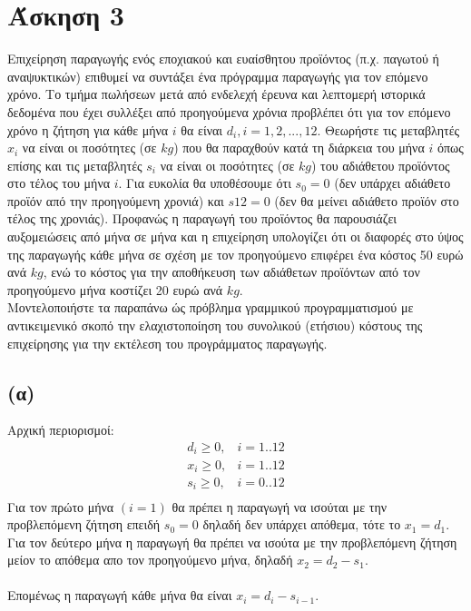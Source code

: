\documentclass[12pt]{report}
\begin{document}
\section*{Άσκηση 3}
Επιχείρηση παραγωγής ενός εποχιακού και ευαίσθητου προϊόντος (π.χ. παγωτού ή
αναψυκτικών) επιθυμεί να συντάξει ένα πρόγραμμα παραγωγής για τον επόμενο
χρόνο. Το τμήμα πωλήσεων μετά από ενδελεχή έρευνα και λεπτομερή ιστορικά
δεδομένα
που έχει συλλέξει από προηγούμενα χρόνια προβλέπει ότι για τον επόμενο χρόνο η
ζήτηση
για κάθε μήνα $i$ θα είναι $d_i, i = 1, 2, . . . , 12$. Θεωρήστε τις μεταβλητές
$x_i$ να είναι οι ποσότητες (σε $kg$) που θα παραχθούν κατά τη διάρκεια του
μήνα $i$ όπως επίσης και τις μεταβλητές
$s_i$ να είναι οι ποσότητες (σε $kg$) του αδιάθετου προϊόντος στο τέλος του
μήνα $i$. Για ευκολία
θα υποθέσουμε ότι $s_0 = 0$ (δεν υπάρχει αδιάθετο προϊόν από την προηγούμενη
χρονιά) και
$s{12} = 0$ (δεν θα μείνει αδιάθετο προϊόν στο τέλος της χρονιάς). Προφανώς η
παραγωγή του
προϊόντος θα παρουσιάζει αυξομειώσεις από μήνα σε μήνα και η επιχείρηση
υπολογίζει ότι
οι διαφορές στο ύψος της παραγωγής κάθε μήνα σε σχέση με τον προηγούμενο
επιφέρει ένα
κόστος 50 ευρώ ανά $kg$, ενώ το κόστος για την αποθήκευση των αδιάθετων
προϊόντων από
τον προηγούμενο μήνα κοστίζει 20 ευρώ ανά $kg$.\\
Μοντελοποιήστε τα παραπάνω ώς πρόβλημα γραμμικού προγραμματισμού με
αντικειμενικό σκοπό την ελαχιστοποίηση του συνολικού (ετήσιου) κόστους της
επιχείρησης για την
εκτέλεση του προγράμματος παραγωγής.
\subsection*{(α)}
Αρχική περιορισμοί:
$$
    \begin{array}{rl}
        d_i \geq 0 , & i = 1..12 \\
        x_i \geq 0 , & i = 1..12 \\
        s_i \geq 0 , & i = 0..12 \\
    \end{array}
$$
Για τον πρώτο μήνα ${(i = 1)}$ θα πρέπει η παραγωγή να ισούται με την
προβλεπόμενη ζήτηση
επειδή $s_0 = 0$ δηλαδή δεν υπάρχει απόθεμα, τότε το $ x_1 = d_1 $.\\
Για τον δεύτερο μήνα η παραγωγή θα πρέπει να ισούτα με την προβλεπόμενη ζήτηση
μείον το απόθεμα απο τον
προηγούμενο μήνα, δηλαδή $ x_2 = d_2 - s_1 $.\\\\
Επομένως η παραγωγή κάθε μήνα θα είναι $ x_i = d_i - s_{i-1}$.\\
\end{document}
